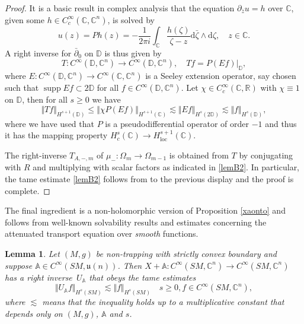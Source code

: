 \documentclass[JEP,XML,SOM,Unicode,published]{cedram}
\theoremstyle{plain}
\newtheorem{lemma}[theorem]{Lemma}
\theoremstyle{definition}
\newcommand{\A}{\mathbb{A}}
\newcommand{\R}{\mathbb{R}}
\newcommand{\C}{\mathbb{C}}
\newcommand{\DD}{\mathbb{D}}
\renewcommand{\u}{\mathfrak{u}}
\renewcommand{\d}{\mathrm{d}}
\DeclareMathOperator{\supp}{supp}
\newcommand{\1}{{\bf 1}}
\begin{document}
\begin{proof}
It is a basic result in complex analysis that the equation $\partial_{\bar z} u = h$ over $\C$, given some $h\in C_c^\infty(\C,\C^n)$, is solved by
\begin{equation*}
u(z)=Ph(z ) = - \frac{1}{2\pi i} \int_\C \frac{h(\zeta)}{\zeta - z} \d \bar \zeta \wedge \d \zeta,\quad z\in \C.
\end{equation*}
A right inverse for $\bar \partial_0$ on $\DD$ is thus given by
\begin{equation*}
T:C^\infty(\DD,\C^n)\to C^\infty(\DD,\C^n),\quad Tf = P(Ef)\vert_{\DD},
\end{equation*}
where $E:C^\infty(\DD,\C^n)\to C^\infty(\C,\C^n)$ is a Seeley extension operator, say chosen such that $\supp Ef\subset 2\DD$ for all $f\in C^\infty(\DD,\C^n)$. Let $\chi\in C_c^\infty(\C,\R)$ with $\chi \equiv 1$ on $\DD$, then for all $s\ge 0$ we have
\begin{equation*}
\Vert Tf \Vert_{H^{s+1}(\DD)} \le \Vert \chi P (Ef) \Vert_{H^{s+1}(\C)} \lesssim \Vert E f \Vert_{H^{s}(2\DD)} \lesssim \Vert f \Vert_{H^s(\DD)},
\end{equation*}
where we have used that $P$ is a pseudodifferential operator of order $-1$ and thus it has the mapping property $H^{s}_{c}(\C)\to H^{s+1}_\mathrm{loc}(\C)$.

The right-inverse $T_{A,-,m}$ of $\mu_-:\Omega_m\to \Omega_{m-1}$ is obtained from $T$ by conjugating with $R$ and multiplying with scalar factors as indicated in \eqref{lemB2}. In particular, the tame estimate \eqref{lemB2} follows from to the previous display and the proof is complete.
\end{proof}

The final ingredient is a non-holomorphic version of Proposition \ref{xaonto} and follows from well-known solvability results and estimates concerning the attenuated transport equation over \emph{smooth} functions.

\begin{lemma} \label{lemC}
Let $(M,g)$ be non-trapping with strictly convex boundary and suppose $\A\in C^\infty(SM,\u(n))$. Then $X+\A:C^\infty(SM,\C^{n})\to C^\infty(SM,\C^{n})$ has a right inverse~$U_\A$ that obeys the tame estimates
\begin{equation*}
\Vert U_\A f \Vert_{H^s(SM)} \lesssim \Vert f \Vert_{H^s(SM)}\quad s\ge 0, f\in C^\infty(SM,\C^{n}),
\end{equation*}
where $\lesssim$ means that the inequality holds up to a multiplicative constant that depends only on $(M,g)$, $\A$ and $s$.
\end{lemma}
\end{document}
